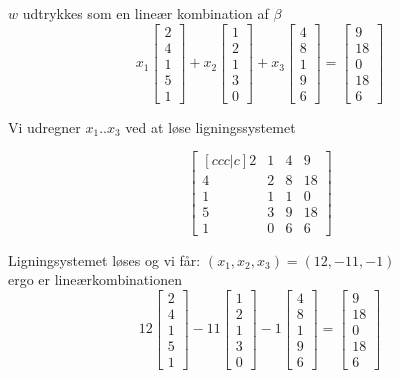 \documentclass[12pt]{article}
\begin{document}
{$w$ udtrykkes som en lineær kombination af $\beta$
\[
x_1 \begin{bmatrix} 2 \\ 4 \\ 1 \\ 5 \\ 1\end{bmatrix} +
x_2 \begin{bmatrix} 1 \\ 2 \\ 1 \\ 3 \\ 0\end{bmatrix} +
x_3 \begin{bmatrix} 4 \\ 8 \\ 1 \\ 9 \\ 6\end{bmatrix} =
\begin{bmatrix}
9 \\18 \\0 \\18 \\6
\end{bmatrix} 
\]

Vi udregner $x_1 .. x_3$ ved at løse ligningssystemet

\[
\begin{bmatrix}[ccc|c]
2 & 1 & 4 & 9 \\
4 & 2 & 8 & 18\\
1 & 1 & 1 & 0 \\
5 & 3 & 9 & 18 \\
1 & 0 & 6 & 6
\end{bmatrix} 
\]


Ligningsystemet løses og vi får: $(x_1, x_2, x_3) = (12, -11, -1)$ \\

ergo er lineærkombinationen 
\[
12 \begin{bmatrix} 2 \\ 4 \\ 1 \\ 5 \\ 1\end{bmatrix} 
-11 \begin{bmatrix} 1 \\ 2 \\ 1 \\ 3 \\ 0\end{bmatrix} 
-1 \begin{bmatrix} 4 \\ 8 \\ 1 \\ 9 \\ 6\end{bmatrix} =
\begin{bmatrix}
9 \\18 \\0 \\18 \\6
\end{bmatrix} 
\]

}
\end{document}

